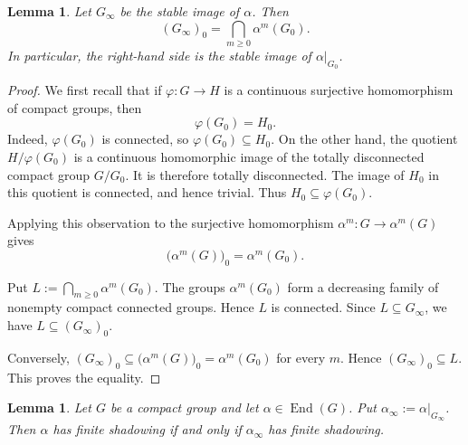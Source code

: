 \documentclass[12pt]{amsart}
\newtheorem{lemma}[theorem]{Lemma}
\theoremstyle{definition}
\numberwithin{equation}{section}
\theoremstyle{remark}
\def\End{\operatorname{End}}
\begin{document}
\begin{lemma}\label{lem:stable-component}
Let $G_\infty$ be the stable image of $\alpha$. Then
\[
(G_\infty)_0
=
\bigcap_{m\geq 0}\alpha^m(G_0).
\]
In particular, the right-hand side is the stable image of
$\alpha|_{G_0}$.
\end{lemma}

\begin{proof}
We first recall that if $\varphi:G\to H$ is a continuous surjective
homomorphism of compact groups, then
\[
\varphi(G_0)=H_0.
\]
Indeed, $\varphi(G_0)$ is connected, so
$
\varphi(G_0)\subseteq H_0.
$
On the other hand, the quotient $H/\varphi(G_0)$ is a continuous
homomorphic image of the totally disconnected compact group $G/G_0$.
It is therefore totally disconnected. The image of $H_0$ in this
quotient is connected, and hence trivial. Thus
$
H_0\subseteq\varphi(G_0).
$

Applying this observation to the surjective homomorphism
$
\alpha^m:G\to\alpha^m(G)
$
gives
\[
\bigl(\alpha^m(G)\bigr)_0=\alpha^m(G_0).
\]

Put
$
L:=\bigcap_{m\geq 0}\alpha^m(G_0).
$
The groups $\alpha^m(G_0)$ form a decreasing family of nonempty compact
connected groups. Hence $L$ is connected. Since $L\subseteq G_\infty$,
we have
$
L\subseteq(G_\infty)_0.
$

Conversely,
$
(G_\infty)_0
\subseteq\bigl(\alpha^m(G)\bigr)_0
=\alpha^m(G_0)
$
for every $m$. Hence
$
(G_\infty)_0\subseteq L.
$
This proves the equality.
\end{proof}


\begin{lemma}\label{lem:stable-image}
	Let $G$ be a compact group and let $\alpha\in\End(G)$. Put
	$\alpha_\infty:=\alpha|_{G_\infty}$. Then $\alpha$ has finite
	shadowing if and only if $\alpha_\infty$ has finite shadowing.
\end{lemma}
\end{document}
